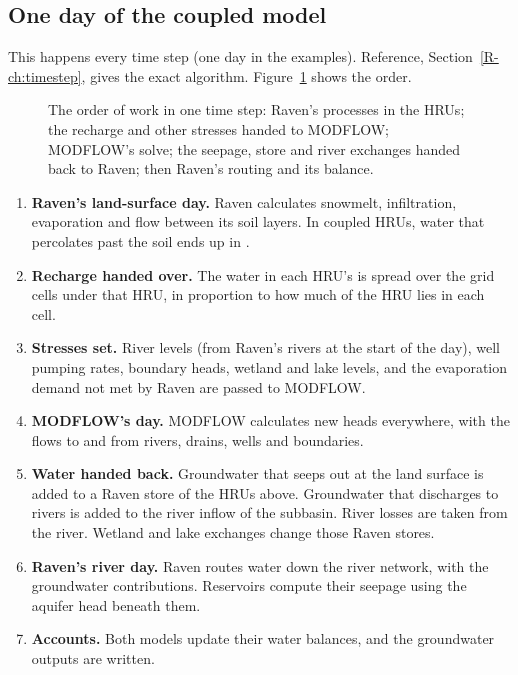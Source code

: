 \subsection{One day of the coupled model}
This happens every time step (one day in the examples). Reference, Section~\ref{R-ch:timestep}, gives the exact
algorithm.
Figure~\ref{fig:utimeline} shows the order.
\begin{figure}[!htbp]\centering

\caption{The order of work in one time step: Raven's processes in the HRUs; the recharge and other stresses handed to MODFLOW; MODFLOW's solve; the seepage, store and river exchanges handed back to Raven; then Raven's routing and its balance.}\label{fig:utimeline}
\end{figure}
\begin{enumerate}
\item \textbf{Raven's land-surface day.} Raven calculates snowmelt, infiltration, evaporation and flow between its soil
layers. In coupled HRUs, water that percolates past the soil ends up in .
\item \textbf{Recharge handed over.} The water in each HRU's  is spread over the grid cells under that
HRU, in proportion to how much of the HRU lies in each cell.
\item \textbf{Stresses set.} River levels (from Raven's rivers at the start of the day), well pumping rates, boundary
heads, wetland and lake levels, and the evaporation demand not met by Raven are passed to MODFLOW.
\item \textbf{MODFLOW's day.} MODFLOW calculates new heads everywhere, with the flows to and from rivers, drains,
wells and boundaries.
\item \textbf{Water handed back.} Groundwater that seeps out at the land surface is added to a Raven store of the HRUs
above. Groundwater that discharges to rivers is added to the river inflow of the subbasin. River losses are taken from
the river. Wetland and lake exchanges change those Raven stores.
\item \textbf{Raven's river day.} Raven routes water down the river network, with the groundwater contributions.
Reservoirs compute their seepage using the aquifer head beneath them.
\item \textbf{Accounts.} Both models update their water balances, and the groundwater outputs are written.
\end{enumerate}

